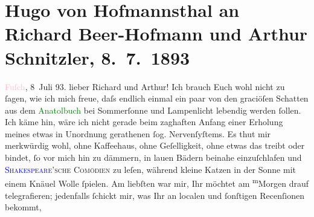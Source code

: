 

               \section[Hugo von Hofmannsthal an Richard Beer-Hofmann und Arthur Schnitzler, 8. 7. 1893]{ Hugo von Hofmannsthal an Richard Beer-Hofmann und Arthur Schnitzler,
               8. 7. 1893}\nopagebreak{}\rehead{ }\normalsize\beginnumbering{} \toendnotes[C]{\smallbreak\pagebreak[2]} 
\pstart
           \raggedleft{}{\pb}\textcolor{pink}{Fuſch}{}\ledrightnote{\textcolor{pink}{Bad Fusch}}, 8 Juli 93.\pend
           \pstart{}lieber Richard und Arthur!\pend\pstart
           Ich brauch Euch wohl nicht zu ſagen, wie ich mich freue, daſs endlich einmal ein paar
               von den graciöſen Schatten aus dem \textcolor{green}{Anatolbuch}{}\ledrightnote{\textcolor{green}{Anatol}} bei
               Sommerſonne und Lampenlicht lebendig werden ſollen. Ich käme hin, wäre ich nicht
               gerade beim zaghaften Anfang einer Erholung meines etwas in Unordnung gerathenen ſog.
               Nervenſyſtems.\pend
           \pstart
           Es thut mir merkwürdig wohl, ohne Kaffeehaus, ohne Geſelligkeit, ohne etwas das
               treibt oder bindet, ſo vor mich hin zu dämmern, {\pb}in
               lauen Bädern beinahe einzuſchlafen und \textsc{\textcolor{blue}{Shakespeare}{}\ledrightnote{\textcolor{blue}{William Shakespeare}}’sche Comödien} zu leſen,
               während kleine Katzen in der Sonne mit einem Knäuel Wolle ſpielen. Am liebſten war
               mir, Ihr möchtet am \substVorne{}\textsuperscript{m}\substDazwischen{}M\substHinten{}orgen drauf telegrafieren; jedenfalls ſchickt mir, was Ihr an  localen und ſonſtigen Recenſionen bekommt,
